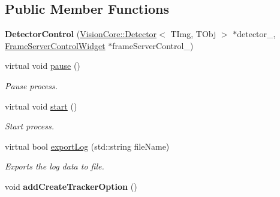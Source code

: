 \subsection*{Public Member Functions}
\begin{DoxyCompactItemize}
\item 
\hypertarget{class_detector_control_aba6469573c749f73ecc4b13940bb4c6b}{}{\bfseries Detector\+Control} (\hyperlink{class_vision_core_1_1_interfaces_1_1_detector}{Vision\+Core\+::\+Detector}$<$ T\+Img, T\+Obj $>$ $\ast$detector\+\_\+, \hyperlink{class_frame_server_control_widget}{Frame\+Server\+Control\+Widget} $\ast$frame\+Server\+Control\+\_\+)\label{class_detector_control_aba6469573c749f73ecc4b13940bb4c6b}

\item 
\hypertarget{class_detector_control_a7167f5c196fc5e167bfabde1a730e81d}{}virtual void \hyperlink{class_detector_control_a7167f5c196fc5e167bfabde1a730e81d}{pause} ()\label{class_detector_control_a7167f5c196fc5e167bfabde1a730e81d}

\begin{DoxyCompactList}\small\item\em Pause process. \end{DoxyCompactList}\item 
\hypertarget{class_detector_control_a60de64d75454385b23995437f1d72669}{}virtual void \hyperlink{class_detector_control_a60de64d75454385b23995437f1d72669}{start} ()\label{class_detector_control_a60de64d75454385b23995437f1d72669}

\begin{DoxyCompactList}\small\item\em Start process. \end{DoxyCompactList}\item 
\hypertarget{class_detector_control_aaadbbf21c8bf5d7b6be811068d1ccc21}{}virtual bool \hyperlink{class_detector_control_aaadbbf21c8bf5d7b6be811068d1ccc21}{export\+Log} (std\+::string file\+Name)\label{class_detector_control_aaadbbf21c8bf5d7b6be811068d1ccc21}

\begin{DoxyCompactList}\small\item\em Exports the log data to file. \end{DoxyCompactList}\item 
\hypertarget{class_detector_control_a13f870b13ebedc10aecf403b8f0c9a50}{}void {\bfseries add\+Create\+Tracker\+Option} ()\label{class_detector_control_a13f870b13ebedc10aecf403b8f0c9a50}

\end{DoxyCompactItemize}
